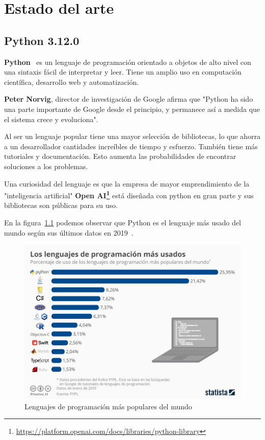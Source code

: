 \documentclass[a4paper, 12pt]{book}
\begin{document}
\cleardoublepage
\chapter{Estado del arte}
\label{chap:estado}


\section{Python 3.12.0} 
\label{sec:python}
\textbf{Python}~\cite{oracle:_python} es un lenguaje de programación orientado a objetos de alto nivel con una sintaxis fácil de interpretar y leer. Tiene un amplio uso en computación científica, desarrollo web y automatización.

\textbf{Peter Norvig}, director de investigación de Google afirma que "Python ha sido una parte importante de Google desde el principio, y permanece así a medida que el sistema crece y evoluciona".

Al ser un lenguaje popular tiene una mayor selección de bibliotecas, lo que ahorra a un desarrollador cantidades increíbles de tiempo y esfuerzo. También tiene más tutoriales y documentación. Esto aumenta las probabilidades de encontrar soluciones a los problemas.

Una curiosidad del lenguaje es que la empresa de mayor emprendimiento de la "inteligencia artificial"  \textbf{ Open AI\footnote{\url{https://platform.openai.com/docs/libraries/python-library}}} está diseñada con python en gran parte y sus bibliotecas son públicas para su uso.

En la figura~\ref{fig:evolucion_python} podemos observar que Python es el lenguaje más usado del mundo según sus últimos datos en 2019~\cite{statista:_tecnología}.

\begin{figure}
	\centering
	\includegraphics[width=14cm, keepaspectratio]{img/ev_python.jpeg}
	\caption{Lenguajes de programación más populares del mundo}
	\label{fig:evolucion_python}
\end{figure}
\end{document}

